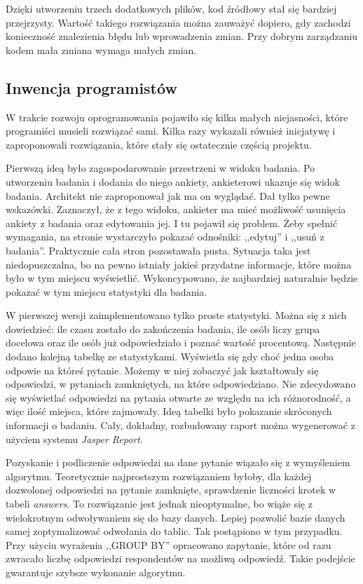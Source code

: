 \documentclass[12pt]{article}
\begin{document}
Dzięki utworzeniu trzech dodatkowych plików, kod źródłowy stał się bardziej przejrzysty. Wartość takiego rozwiązania można zauważyć dopiero, gdy zachodzi konieczność znalezienia błędu lub wprowadzenia zmian. Przy dobrym zarządzaniu kodem mała zmiana wymaga małych zmian.

\subsection{Inwencja programistów}

W trakcie rozwoju oprogramowania pojawiło się kilka małych niejasności, które programiści musieli rozwiązać sami. Kilka razy wykazali również inicjatywę i zaproponowali rozwiązania, które stały się ostatecznie częścią projektu.

Pierwszą ideą było zagospodarowanie przestrzeni w widoku badania. Po utworzeniu badania i dodania do niego ankiety, ankieterowi ukazuje się widok badania. Architekt nie zaproponował jak ma on wyglądać. Dał tylko pewne wskazówki. Zaznaczył, że z tego widoku, ankieter ma mieć możliwość usunięcia ankiety z badania oraz edytowania jej. I tu pojawił się problem. Żeby spełnić wymagania, na stronie wystarczyło pokazać odnośniki: ,,edytuj'' i ,,usuń z badania''. Praktycznie cała stron pozostawała pusta. Sytuacja taka jest niedopuszczalna, bo na pewno istniały jakieś przydatne informacje, które można było w tym miejscu wyświetlić. Wykoncypowano, że najbardziej naturalnie będzie pokazać w tym miejscu statystyki dla badania.

W pierwszej wersji zaimplementowano tylko proste statystyki. Można się z nich dowiedzieć: ile czasu zostało do zakończenia badania, ile osób liczy grupa docelowa oraz ile osób już odpowiedziało i poznać wartość procentową. Następnie dodano kolejną tabelkę ze statystykami. Wyświetla się gdy choć jedna osoba odpowie na któreś pytanie. Możemy w niej zobaczyć jak kształtowały się odpowiedzi, w pytaniach zamkniętych, na które odpowiedziano. Nie zdecydowano się wyświetlać odpowiedzi na pytania otwarte ze względu na ich różnorodność, a więc ilość miejsca, które zajmowały. Ideą tabelki było pokazanie skróconych informacji o badaniu. Cały, dokładny, rozbudowany raport można wygenerować z użyciem systemu \emph{Jasper Report}.

Pozyskanie i podliczenie odpowiedzi na dane pytanie wiązało się z wymyśleniem algorytmu. Teoretycznie najprostszym rozwiązaniem byłoby, dla każdej dozwolonej odpowiedzi na pytanie zamknięte, sprawdzenie liczności krotek w tabeli \emph{answers}. To rozwiązanie jest jednak nieoptymalne, bo wiąże się z wielokrotnym odwoływaniem się do bazy danych. Lepiej pozwolić bazie danych samej zoptymalizować odwołania do tablic. Tak postąpiono w tym przypadku. Przy użyciu wyrażenia ,,GROUP BY'' opracowano zapytanie, które od razu zwracało liczbę odpowiedzi respondentów na możliwą odpowiedź. Takie podejście gwarantuje szybsze wykonanie algorytmu.
\end{document}
